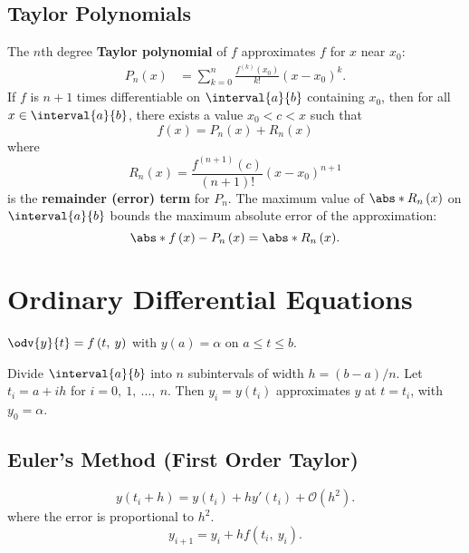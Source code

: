 \documentclass{article}
\begin{document}
\begin{multicols}{3}
    \subsection{Taylor Polynomials}
    The \(n\)th degree \textbf{Taylor polynomial} of \(f\)
    approximates \(f\) for \(x\) near \(x_0\):
    \begin{align*}
        P_n\left( x \right) & = \sum_{k = 0}^n \frac{f^{\left( k \right)}\left( x_0 \right)}{k!} \left( x - x_0 \right)^k.
    \end{align*}
    If \(f\) is \(n + 1\) times differentiable on \(\interval{a}{b}\) containing \(x_0\),
    then for all \(x \in \interval{a}{b}\),
    there exists a value \(x_0 < c < x\) such that
    \begin{equation*}
        f\left( x \right) = P_n\left( x \right) + R_n\left( x \right)
    \end{equation*}
    where
    \begin{equation*}
        R_n\left( x \right) = \frac{f^{\left( n + 1 \right)}\left( c \right)}{\left( n + 1 \right)!} \left( x - x_0 \right)^{n + 1}
    \end{equation*}
    is the \textbf{remainder (error) term} for \(P_n\).
    The maximum value of \(\abs*{R_n\left( x \right)}\) on \(\interval{a}{b}\) bounds the maximum absolute error of the approximation:
    \begin{equation*}
        \abs*{f\left( x \right) - P_n\left( x \right)} = \abs*{R_n\left( x \right)}.
    \end{equation*}
    \section{Ordinary Differential Equations}
    \(\odv{y}{t} = f\left( t,\: y \right)\) with \(y\left( a \right) = \alpha\) on \(a \leq t \leq b\).

    Divide \(\interval{a}{b}\) into \(n\) subintervals of width \(h = \left( b - a \right) / n\).
    Let \(t_i = a + i h\) for \(i = 0,\: 1,\: \ldots,\: n\).
    Then \(y_i = y\left( t_i \right)\) approximates \(y\) at \(t = t_i\), with \(y_0 = \alpha\).
    \subsection{Euler's Method (First Order Taylor)}
    \begin{equation*}
        y\left( t_i + h \right) = y\left( t_i \right) + h y'\left( t_i \right) + \mathcal{O}\left( h^2 \right).
    \end{equation*}
    where the error is proportional to \(h^2\).
    \begin{equation*}
        y_{i + 1} = y_i + h f\left( t_i,\: y_i \right).
    \end{equation*}

\end{multicols}
\end{document}

